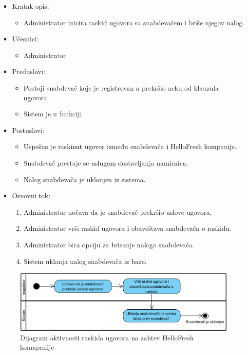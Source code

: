 \begin{itemize}
    \item Kratak opis:
        \begin{itemize}
            \item Administrator inicira raskid ugovora sa snabdevačem i briše njegov nalog.
        \end{itemize}
    \item Učesnici:
        \begin{itemize}
            \item Administrator
        \end{itemize}
    \item Preduslovi:
        \begin{itemize}
            \item Postoji snabdevač koje je registrovan a prekršio neku od klauzula ugovora.
            \item Sistem je u funkciji.
        \end{itemize}
    \item Postuslovi:
        \begin{itemize}
            \item Uspešno je raskinut ugovor između snabdevača i HelloFresh kompanije.
            \item Snabdevač prestaje se uslugom dostavljanja namirnica.
            \item Nalog snabdevača je uklonjen iz sistema.
        \end{itemize}
    \item Osnovni tok:
        \begin{enumerate}
            \item Administrator uočava da je snabdevač prekršio uslove ugovora.
            \item Administrator vrši raskid ugovora i obaveštava snabdevača o raskidu.
            \item Administrator bira opciju za brisanje naloga snabdevača.
            \item Sistem uklanja nalog snabdevača iz baze.
        \end{enumerate}
\end{itemize}

\begin{figure}[H]
\begin{center}
\includegraphics[width=\textwidth]{Pictures/activity_supplier_contract_termination_2.png}
\end{center}
    \caption{Dijagram aktivnosti raskida ugovora na zahtev HelloFresh komapanije}
\label{fig:ActivitySupplierContractTermination2}
\end{figure}